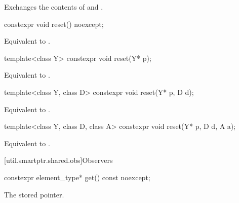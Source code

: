 \begin{itemdescr}

\pnum
\effects
Exchanges the contents of  and .
\end{itemdescr}

%
\begin{itemdecl}
constexpr void reset() noexcept;
\end{itemdecl}

\begin{itemdescr}
\pnum
\effects
Equivalent to .
\end{itemdescr}

%
\begin{itemdecl}
template<class Y> constexpr void reset(Y* p);
\end{itemdecl}

\begin{itemdescr}
\pnum
\effects
Equivalent to .
\end{itemdescr}

%
\begin{itemdecl}
template<class Y, class D> constexpr void reset(Y* p, D d);
\end{itemdecl}

\begin{itemdescr}
\pnum
\effects
Equivalent to .
\end{itemdescr}

%
\begin{itemdecl}
template<class Y, class D, class A> constexpr void reset(Y* p, D d, A a);
\end{itemdecl}

\begin{itemdescr}
\pnum
\effects
Equivalent to .
\end{itemdescr}

[util.smartptr.shared.obs]{Observers}
%
\begin{itemdecl}
constexpr element_type* get() const noexcept;
\end{itemdecl}

\begin{itemdescr}
\pnum
\returns
The stored pointer.
\end{itemdescr}

